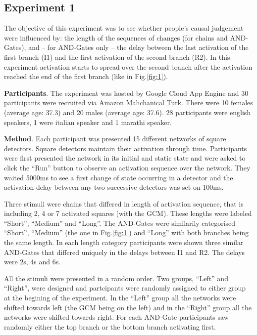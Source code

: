 \documentclass[10pt,letterpaper]{article}
\begin{document}
\subsection{Experiment 1}

The objective of this experiment was to see whether people's causal judgement were influenced by: the length of the sequences of changes (for chains and AND-Gates), and -- for AND-Gates only -- the delay between the last activation of the first branch (I1) and the first activation of the second branch (R2). In this experiment activation starts to spread over the second branch after the activation reached the end of the first branch (like in Fig.\ref{fig:1}).

\textbf{Participants}. The experiment was hosted by Google Cloud App Engine and 30 participants were recruited via Amazon Mahchanical Turk. There were 10 females (average age: 37.3) and 20 males (average age: 37.6). 28 participants were english speakers, 1 were italian speaker and 1 marathi speaker.

\textbf{Method}. Each participant was presented 15 different networks of square detectors. Square detectors maintain their activation through time. Participants were first presented the network in its initial and static state and were asked to click the ``Run'' button to observe an activation sequence over the network. They waited 5000ms to see a first change of state occurring in a detector and the activation delay between any two successive detectors was set on 100ms. 

Three stimuli were chains that differed in length of activation sequence, that is including 2, 4 or 7 activated squares (with the GCM). These lengths were labeled ``Short'', ``Medium'' and ``Long''. The AND-Gates were similarily categorised ``Short'', ``Medium'' (the one in Fig.\ref{fig:1}) and ``Long'' with both branches being the same length. In each length category participants were shown three similar AND-Gates that differed uniquely in the delays between I1 and R2. The delays were 2s, 4s and 6s.

All the stimuli were presented in a random order. Two groups, ``Left'' and ``Right'', were designed and partcipants were randomly assigned to either group at the begining of the experiment. In the ``Left'' group all the networks were shifted towards left (the GCM being on the left) and in the ``Right'' group all the networks were shifted towards right. For each AND-Gate participants saw randomly either the top branch or the bottom branch activating first.
\end{document}
